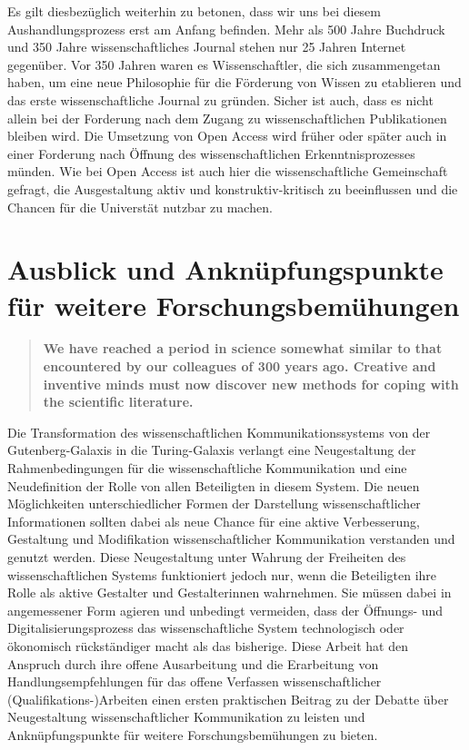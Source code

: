 Es gilt diesbezüglich weiterhin zu betonen, dass wir uns bei diesem Aushandlungsprozess erst am Anfang befinden. Mehr als 500 Jahre Buchdruck und 350 Jahre wissenschaftliches Journal stehen nur 25 Jahren Internet gegenüber. Vor 350 Jahren waren es Wissenschaftler, die sich zusammengetan haben, um eine neue Philosophie für die Förderung von Wissen zu etablieren und das erste wissenschaftliche Journal zu gründen. Sicher ist auch, dass es nicht allein bei der Forderung nach dem Zugang zu wissenschaftlichen Publikationen bleiben wird. Die Umsetzung von Open Access wird früher oder später auch in einer Forderung nach Öffnung des wissenschaftlichen Erkenntnisprozesses münden. Wie bei Open Access ist auch hier die wissenschaftliche Gemeinschaft gefragt, die Ausgestaltung aktiv und konstruktiv-kritisch zu beeinflussen und die Chancen für die Universtät nutzbar zu machen.

\section{Ausblick und Anknüpfungspunkte für weitere Forschungsbemühungen}

\begin{quote}
\textbf{We have reached a period in science somewhat similar to that encountered by our colleagues of 300 years ago. Creative and inventive minds must now discover new methods for coping with the scientific literature.}
\end{quote} \cite{porter_1964_scientific}

Die Transformation des wissenschaftlichen Kommunikationssystems von der Gutenberg-Galaxis in die Turing-Galaxis verlangt eine Neugestaltung der Rahmenbedingungen für die wissenschaftliche Kommunikation und eine Neudefinition der Rolle von allen Beteiligten in diesem System. Die neuen Möglichkeiten unterschiedlicher Formen der Darstellung wissenschaftlicher Informationen sollten dabei als neue Chance für eine aktive Verbesserung, Gestaltung und Modifikation wissenschaftlicher Kommunikation verstanden und genutzt werden. Diese Neugestaltung unter Wahrung der Freiheiten des wissenschaftlichen Systems funktioniert jedoch nur, wenn die Beteiligten ihre Rolle als aktive Gestalter und Gestalterinnen wahrnehmen. Sie müssen dabei in angemessener Form agieren und unbedingt vermeiden, dass der Öffnungs- und Digitalisierungsprozess das wissenschaftliche System technologisch oder ökonomisch rückständiger macht als das bisherige. Diese Arbeit hat den Anspruch durch ihre offene Ausarbeitung und die Erarbeitung von Handlungsempfehlungen für das offene Verfassen wissenschaftlicher (Qualifikations-)Arbeiten einen ersten praktischen Beitrag zu der Debatte über Neugestaltung wissenschaftlicher Kommunikation zu leisten und Anknüpfungspunkte für weitere Forschungsbemühungen zu bieten.

